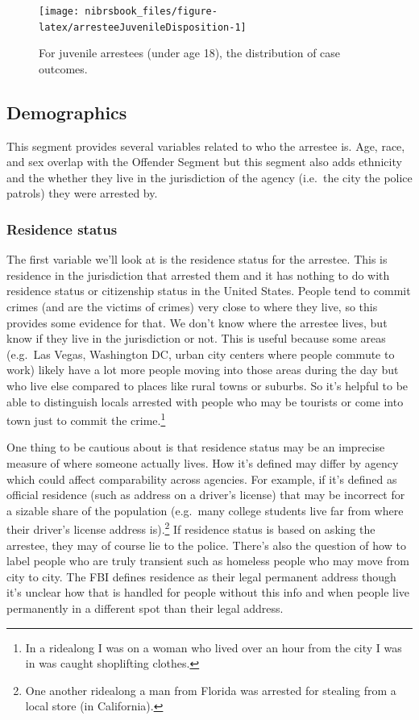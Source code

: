 \documentclass[
  12pt,
  openany]{book}
\begin{document}
\begin{figure}

{\centering \texttt{[image: nibrsbook\_files/figure-latex/arresteeJuvenileDisposition-1]} 

}

\caption{For juvenile arrestees (under age 18), the distribution of case outcomes.}\label{fig:arresteeJuvenileDisposition}
\end{figure}

\hypertarget{demographics-2}{%
\subsection{Demographics}\label{demographics-2}}

This segment provides several variables related to who the arrestee is. Age, race, and sex overlap with the Offender Segment but this segment also adds ethnicity and the whether they live in the jurisdiction of the agency (i.e.~the city the police patrols) they were arrested by.

\hypertarget{residence-status-1}{%
\subsubsection{Residence status}\label{residence-status-1}}

The first variable we'll look at is the residence status for the arrestee. This is residence in the jurisdiction that arrested them and it has nothing to do with residence status or citizenship status in the United States. People tend to commit crimes (and are the victims of crimes) very close to where they live, so this provides some evidence for that. We don't know where the arrestee lives, but know if they live in the jurisdiction or not. This is useful because some areas (e.g.~Las Vegas, Washington DC, urban city centers where people commute to work) likely have a lot more people moving into those areas during the day but who live else compared to places like rural towns or suburbs. So it's helpful to be able to distinguish locals arrested with people who may be tourists or come into town just to commit the crime.\footnote{In a ridealong I was on a woman who lived over an hour from the city I was in was caught shoplifting clothes.}

One thing to be cautious about is that residence status may be an imprecise measure of where someone actually lives. How it's defined may differ by agency which could affect comparability across agencies. For example, if it's defined as official residence (such as address on a driver's license) that may be incorrect for a sizable share of the population (e.g.~many college students live far from where their driver's license address is).\footnote{One another ridealong a man from Florida was arrested for stealing from a local store (in California).} If residence status is based on asking the arrestee, they may of course lie to the police. There's also the question of how to label people who are truly transient such as homeless people who may move from city to city. The FBI defines residence as their legal permanent address though it's unclear how that is handled for people without this info and when people live permanently in a different spot than their legal address.
\end{document}
